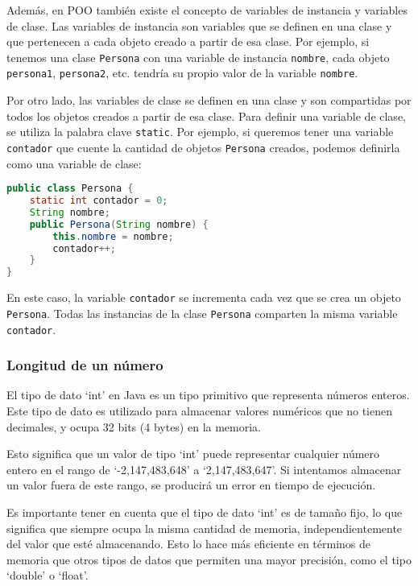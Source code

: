 \documentclass{article}
\begin{document}
Además, en POO también existe el concepto de variables de instancia y variables de clase. Las variables de instancia son variables que se definen en una clase y que pertenecen a cada objeto creado a partir de esa clase. Por ejemplo, si tenemos una clase \lstinline{Persona} con una variable de instancia \lstinline{nombre}, cada objeto \lstinline{persona1}, \lstinline{persona2}, etc. tendría su propio valor de la variable \lstinline{nombre}.

Por otro lado, las variables de clase se definen en una clase y son compartidas por todos los objetos creados a partir de esa clase. Para definir una variable de clase, se utiliza la palabra clave \lstinline{static}. Por ejemplo, si queremos tener una variable \lstinline{contador} que cuente la cantidad de objetos \lstinline{Persona} creados, podemos definirla como una variable de clase:

\begin{lstlisting}[language=Java]
public class Persona {
    static int contador = 0;
    String nombre;
    public Persona(String nombre) {
        this.nombre = nombre;
        contador++;
    }
}
\end{lstlisting}

En este caso, la variable \lstinline{contador} se incrementa cada vez que se crea un objeto \lstinline{Persona}. Todas las instancias de la clase \lstinline{Persona} comparten la misma variable \lstinline{contador}.

\subsubsection*{Longitud de un número}
El tipo de dato \enquote*{int} en Java es un tipo primitivo que representa números enteros. Este tipo de dato es utilizado para almacenar valores numéricos que no tienen decimales, y ocupa 32 bits (4 bytes) en la memoria.

Esto significa que un valor de tipo \enquote*{int} puede representar cualquier número entero en el rango de \enquote*{-2,147,483,648} a \enquote*{2,147,483,647}. Si intentamos almacenar un valor fuera de este rango, se producirá un error en tiempo de ejecución.

Es importante tener en cuenta que el tipo de dato \enquote*{int} es de tamaño fijo, lo que significa que siempre ocupa la misma cantidad de memoria, independientemente del valor que esté almacenando. Esto lo hace más eficiente en términos de memoria que otros tipos de datos que permiten una mayor precisión, como el tipo \enquote*{double} o \enquote*{float}.
\end{document}
